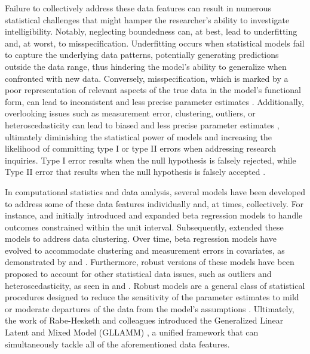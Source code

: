 \documentclass[
  authoryear,
  preprint,
  1p]{elsarticle}
\begin{document}
Failure to collectively address these data features can result in
numerous statistical challenges that might hamper the researcher's
ability to investigate intelligibility. Notably, neglecting boundedness
can, at best, lead to underfitting and, at worst, to misspecification.
{Underfitting occurs when statistical models fail to capture the
underlying data patterns, potentially generating predictions outside the
data range, thus hindering the model's ability to generalize when
confronted with new data.} Conversely, misspecification, which is marked
by a poor representation of relevant aspects of the true data in the
model's functional form, can lead to inconsistent and less precise
parameter estimates \citep{Everitt_et_al_2010}. Additionally,
overlooking issues such as measurement error, clustering, outliers, or
heteroscedasticity can lead to biased and less precise parameter
estimates \citep{McElreath_2020}, ultimately diminishing the statistical
power of models and increasing the likelihood of committing type I or
type II errors when addressing research inquiries. {Type I error results
when the null hypothesis is falsely rejected, while Type II error that
results when the null hypothesis is falsely accepted
\citep{Everitt_et_al_2010}.}

In computational statistics and data analysis, several models have been
developed to address some of these data features individually and, at
times, collectively. For instance, \citet{Ferrari_et_al_2004} and
\citet{Simas_et_al_2010} initially introduced and expanded beta
regression models to handle outcomes constrained within the unit
interval. Subsequently, \citet{Figueroa-Zuniga_et_al_2013} extended
these models to address data clustering. Over time, beta regression
models have evolved to accommodate clustering and measurement errors in
covariates, as demonstrated by \citet{Carrasco_et_al_2012} and
\citet{Figueroa-Zuniga_et_al_2018}. Furthermore, robust versions of
these models have been proposed to account for other statistical data
issues, such as outliers and heteroscedasticity, as seen in
\citet{Bayes_et_al_2012} and \citet{Figueroa-Zuniga_et_al_2021}. Robust
models are a general class of statistical procedures designed to reduce
the sensitivity of the parameter estimates to mild or moderate
departures of the data from the model's assumptions
\citep{Everitt_et_al_2010}. Ultimately, the work of Rabe-Hesketh and
colleagues introduced the Generalized Linear Latent and Mixed Model
(GLLAMM)
\citep{Rabe_et_al_2004a, Rabe_et_al_2004b, Rabe_et_al_2004c, Skrondal_et_al_2004a},
a unified framework that can simultaneously tackle all of the
aforementioned data features.
\end{document}
